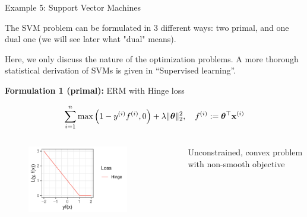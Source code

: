 \begin{vbframe}{Example 5: Support Vector Machines} 

The SVM problem can be formulated in $3$ different ways: two primal, and one dual one (we will see later what "dual" means). 

\begin{footnotesize}
	Here, we only discuss the nature of the optimization problems. A more thorough statistical derivation of SVMs is given in ``Supervised learning''. 
\end{footnotesize}

\vspace*{0.3cm}

\textbf{Formulation 1 (primal): } ERM with Hinge loss

$$
	\sum\limits_{i=1}^n \max\left(1 - y^{(i)} f^{(i)}, 0\right) + \lambda \|\bm{\theta}\|_2^2, \quad f^{(i)} := \bm{\theta}^\top \mathbf{x}^{(i)}
$$

\vspace*{-0.3cm}

\begin{columns}[T] %
	\begin{column}{.58\textwidth}
		\begin{figure}
			\begin{center}
				\includegraphics[width=0.8\textwidth]{figure_man/hinge.pdf}
			\end{center}
		\end{figure}
	\end{column}
	\begin{column}{.38\textwidth} \vspace*{1.5cm}
		\begin{footnotesize}
		Unconstrained, convex problem with non-smooth objective
		\end{footnotesize}
	\end{column}
\end{columns}


\end{vbframe}

